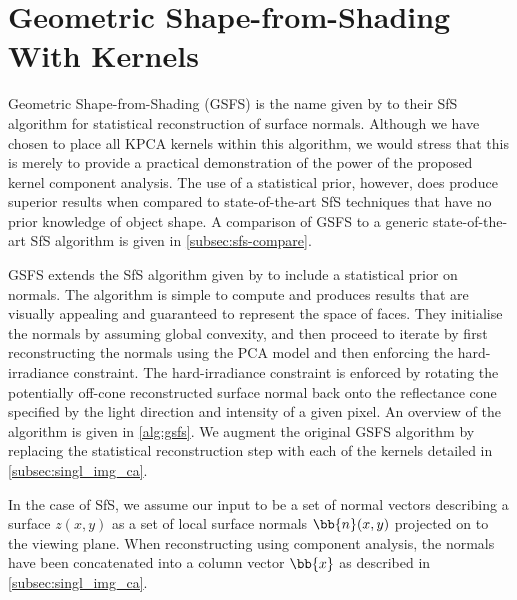 \section{Geometric Shape-from-Shading With Kernels}\label{sec:singl_img_gsfs}
Geometric Shape-from-Shading (GSFS) is the name given by
\cite{smith2006recovering,worthington1999new,smith2008facial} to their
SfS algorithm for statistical
reconstruction of surface normals. Although we have chosen to place all KPCA
kernels within this algorithm, we would stress that this is merely to provide a
practical demonstration of the power of the proposed kernel component analysis.
The use of a statistical prior, however, does produce superior results when
compared to state-of-the-art SfS techniques that have no prior knowledge of
object shape. A comparison of GSFS to a generic state-of-the-art SfS algorithm
is given in \cref{subsec:sfs-compare}.

GSFS extends the SfS algorithm given by \citet{worthington1999new} to include a
statistical prior on normals. The algorithm
is simple to compute and produces results that are visually appealing and
guaranteed to represent the space of faces. They initialise the normals by
assuming global convexity, and then proceed to iterate by first reconstructing
the normals using the PCA model and then enforcing the hard-irradiance
constraint. The hard-irradiance constraint is enforced by rotating the
potentially off-cone reconstructed surface normal back onto the reflectance cone
specified by the light direction and intensity of a given pixel. An overview of
the algorithm is given in \cref{alg:gsfs}. We augment the original GSFS
algorithm by replacing the statistical reconstruction step with each of the
kernels detailed in \cref{subsec:singl_img_ca}.

In the case of SfS, we assume our input to be a set of normal vectors describing
a surface $z(x, y)$ as a set of local surface normals $\bb{n}(x, y)$ projected
on to the viewing plane. When reconstructing using component analysis, the normals
have been concatenated into a column vector $\bb{x}$ as described in
\cref{subsec:singl_img_ca}.

